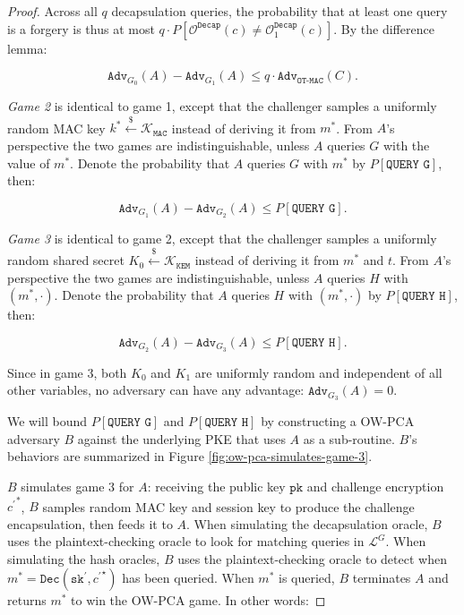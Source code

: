 \documentclass[runningheads]{llncs}
\newcommand{\decrypt}{\texttt{Dec}}
\newcommand{\kem}{\texttt{KEM}}
\newcommand{\decap}{\texttt{Decap}}
\newcommand{\mac}{\texttt{MAC}}
\newcommand{\pk}{\texttt{pk}}
\newcommand{\sk}{\texttt{sk}}
\newcommand{\leftsample}{\stackrel{\$}{\leftarrow}}
\newcommand{\adv}{\texttt{Adv}}
\begin{document}
\begin{proof}
    Across all $q$ decapsulation queries, the probability that at least one query is a forgery is thus at most $q \cdot P\left[\mathcal{O}^\decap(c) \neq \mathcal{O}^\decap_1(c)\right]$. By the difference lemma:

    \begin{equation*}
        \adv_{G_0}(A) - \adv_{G_1}(A) \leq q\cdot  \adv_\texttt{OT-MAC}(C).
    \end{equation*}

    \emph{Game 2} is identical to game 1, except that the challenger samples a uniformly random MAC key $k^\ast \leftsample \mathcal{K}_\mac$ instead of deriving it from $m^\ast$. From $A$'s perspective the two games are indistinguishable, unless $A$ queries $G$ with the value of $m^\ast$. Denote the probability that $A$ queries $G$ with $m^\ast$ by $P[\texttt{QUERY G}]$, then:

    \begin{equation*}
        \adv_{G_1}(A) - \adv_{G_2}(A) \leq P\left[\texttt{QUERY G}\right].
    \end{equation*}

    \emph{Game 3} is identical to game 2, except that the challenger samples a uniformly random shared secret $K_0 \leftsample \mathcal{K}_\kem$ instead of deriving it from $m^\ast$ and $t$. From $A$'s perspective the two games are indistinguishable, unless $A$ queries $H$ with $(m^\ast, \cdot)$. Denote the probability that $A$ queries $H$ with $(m^\ast, \cdot)$ by $P[\texttt{QUERY H}]$, then:

    \begin{equation*}
        \adv_{G_2}(A) - \adv_{G_3}(A) \leq P\left[\texttt{QUERY H}\right].
    \end{equation*}

    Since in game 3, both $K_0$ and $K_1$ are uniformly random and independent of all other variables, no adversary can have any advantage: $\adv_{G_3}(A) = 0$.

    We will bound $P[\texttt{QUERY G}]$ and $P[\texttt{QUERY H}]$ by constructing a OW-PCA adversary $B$ against the underlying PKE that uses $A$ as a sub-routine. $B$'s behaviors are summarized in Figure \ref{fig:ow-pca-simulates-game-3}.

    $B$ simulates game 3 for $A$: receiving the public key $\pk$ and challenge encryption ${c^\prime}^\ast$, $B$ samples random MAC key and session key to produce the challenge encapsulation, then feeds it to $A$. When simulating the decapsulation oracle, $B$ uses the plaintext-checking oracle to look for matching queries in $\mathcal{L}^G$. When simulating the hash oracles, $B$ uses the plaintext-checking oracle to detect when $m^\ast = \decrypt(\sk^\prime, {c^\prime}^\star)$ has been queried. When $m^\ast$ is queried, $B$ terminates $A$ and returns $m^\ast$ to win the OW-PCA game. In other words:


\end{proof}
\end{document}
